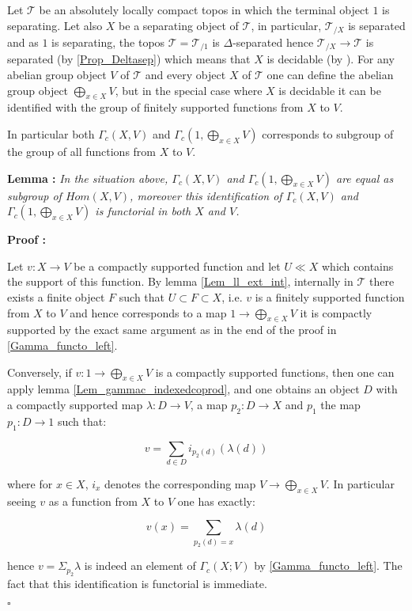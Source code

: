 \documentclass[a4paper]{article}
\newcommand{\Tcal}{\mathcal{T}}
\newcommand{\block}[1]
{

\par \subsubsection{} #1

\bigskip}
\newcommand{\Lem}[1]
	{

	\bigskip
	
	\textbf{Lemma : }{\itshape #1}
		
	\bigskip
	
	}
\newcommand{\Dem}[1]{
	
	\smallskip
	
	\textbf{Proof : } \par
	 {#1} $\square$
	 
	 \bigskip
}
\begin{document}
\block{\label{Lem_WeakseparatingTransport}
Let $\Tcal$ be an absolutely locally compact topos in which the terminal object $1$ is separating. Let also $X$ be a separating object of $\Tcal$, in particular, $\Tcal_{/X}$ is separated and as $1$ is separating, the topos $\Tcal = \Tcal_{/1}$ is $\Delta$-separated hence $\Tcal_{/X} \rightarrow \Tcal$ is separated (by \ref{Prop_Deltasep}) which means that $X$ is decidable (by \cite[II.1.3]{moerdijk2000proper}). For any abelian group object $V$ of $\Tcal$ and every object $X$ of $ \Tcal$ one can define the abelian group object $\bigoplus_{x \in X} V$, but in the special case where $X$ is decidable it can be identified with the group of finitely supported functions from $X$ to $V$.

In particular both $\Gamma_c(X,V)$ and $\Gamma_c(1, \bigoplus_{x \in X} V)$ corresponds to subgroup of the group of all functions from $X$ to $V$.

\Lem{In the situation above, $\Gamma_c(X,V)$ and $\Gamma_c(1, \bigoplus_{x \in X} V)$ are equal as subgroup of $Hom(X,V)$, moreover this identification of $\Gamma_c(X,V)$ and $\Gamma_c(1, \bigoplus_{x \in X} V)$ is functorial in both $X$ and $V$.}


\Dem{Let $v: X \rightarrow V$ be a compactly supported function and let $U \ll X$ which contains the support of this function. By lemma \ref{Lem_ll_ext_int}, internally in $\Tcal$ there exists a finite object $F$ such that $U \subset F \subset X$, i.e. $v$ is a finitely supported function from $X$ to $V$ and hence corresponds to a map $1 \rightarrow \bigoplus_{x \in X} V$ it is compactly supported by the exact same argument as in the end of the proof in \ref{Gamma_functo_left}.

Conversely, if $v:1 \rightarrow \bigoplus_{x \in X} V$ is a compactly supported functions, then one can apply lemma \ref{Lem_gammac_indexedcoprod}, and one obtains an object $D$ with a compactly supported map $\lambda:D \rightarrow V$, a map $p_2:D \rightarrow X$ and $p_1$ the map $p_1:D \rightarrow 1$ such that:

\[ v = \sum_{d \in D} i_{p_2(d)}(\lambda(d))  \]

where for $x \in X$, $i_{x}$ denotes the corresponding map $V \rightarrow \bigoplus_{x \in X} V$. In particular seeing $v$ as a function from $X$ to $V$ one has exactly:

\[ v(x) = \sum_{p_2(d)=x} \lambda(d) \]

hence $v= \Sigma_{p_2} \lambda$ is indeed an element of $\Gamma_c(X;V)$ by \ref{Gamma_functo_left}. 
The fact that this identification is functorial is immediate. 
}}
\end{document}
